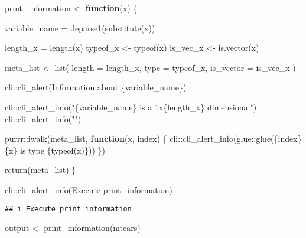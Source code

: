 \documentclass[
]{book}
\newenvironment{Shaded}{\begin{snugshade}}{\end{snugshade}}
\newcommand{\AttributeTok}[1]{\textcolor[rgb]{0.77,0.63,0.00}{#1}}
\newcommand{\ControlFlowTok}[1]{\textcolor[rgb]{0.13,0.29,0.53}{\textbf{#1}}}
\newcommand{\FunctionTok}[1]{\textcolor[rgb]{0.00,0.00,0.00}{#1}}
\newcommand{\NormalTok}[1]{#1}
\newcommand{\OtherTok}[1]{\textcolor[rgb]{0.56,0.35,0.01}{#1}}
\newcommand{\SpecialCharTok}[1]{\textcolor[rgb]{0.00,0.00,0.00}{#1}}
\newcommand{\StringTok}[1]{\textcolor[rgb]{0.31,0.60,0.02}{#1}}
\begin{document}
\begin{Shaded}
\begin{Highlighting}[]
\NormalTok{print\_information }\OtherTok{\textless{}{-}} \ControlFlowTok{function}\NormalTok{(x) \{}
  
\NormalTok{  variable\_name }\OtherTok{=} \FunctionTok{deparse1}\NormalTok{(}\FunctionTok{substitute}\NormalTok{(x))}
  
\NormalTok{  length\_x }\OtherTok{=} \FunctionTok{length}\NormalTok{(x)}
\NormalTok{  typeof\_x }\OtherTok{\textless{}{-}} \FunctionTok{typeof}\NormalTok{(x)}
\NormalTok{  is\_vec\_x }\OtherTok{\textless{}{-}} \FunctionTok{is.vector}\NormalTok{(x)}
  
\NormalTok{  meta\_list }\OtherTok{\textless{}{-}} \FunctionTok{list}\NormalTok{(}
    \AttributeTok{length =}\NormalTok{ length\_x, }
    \AttributeTok{type =}\NormalTok{ typeof\_x, }
    \AttributeTok{is\_vector =}\NormalTok{ is\_vec\_x}
\NormalTok{  )}
  
\NormalTok{  cli}\SpecialCharTok{::}\FunctionTok{cli\_alert}\NormalTok{(}\StringTok{\textquotesingle{}Information about \{variable\_name\}\textquotesingle{}}\NormalTok{)}
  
\NormalTok{  cli}\SpecialCharTok{::}\FunctionTok{cli\_alert\_info}\NormalTok{(}\StringTok{"\{variable\_name\} is a 1x\{length\_x\} dimensional"}\NormalTok{)}
\NormalTok{  cli}\SpecialCharTok{::}\FunctionTok{cli\_alert\_info}\NormalTok{(}\StringTok{""}\NormalTok{)}
  
\NormalTok{  purrr}\SpecialCharTok{::}\FunctionTok{iwalk}\NormalTok{(meta\_list, }\ControlFlowTok{function}\NormalTok{(x, index) \{}
\NormalTok{    cli}\SpecialCharTok{::}\FunctionTok{cli\_alert\_info}\NormalTok{(glue}\SpecialCharTok{::}\FunctionTok{glue}\NormalTok{(}\StringTok{\textquotesingle{}\{index\} \{x\} is type \{typeof(x)\}\textquotesingle{}}\NormalTok{))}
\NormalTok{  \})}
  
  \FunctionTok{return}\NormalTok{(meta\_list)}
\NormalTok{\}}

\NormalTok{cli}\SpecialCharTok{::}\FunctionTok{cli\_alert\_info}\NormalTok{(}\StringTok{\textquotesingle{}Execute print\_information\textquotesingle{}}\NormalTok{)}
\end{Highlighting}
\end{Shaded}

\begin{verbatim}
## i Execute print_information
\end{verbatim}

\begin{Shaded}
\begin{Highlighting}[]
\NormalTok{output }\OtherTok{\textless{}{-}} \FunctionTok{print\_information}\NormalTok{(mtcars)}
\end{Highlighting}
\end{Shaded}
\end{document}
